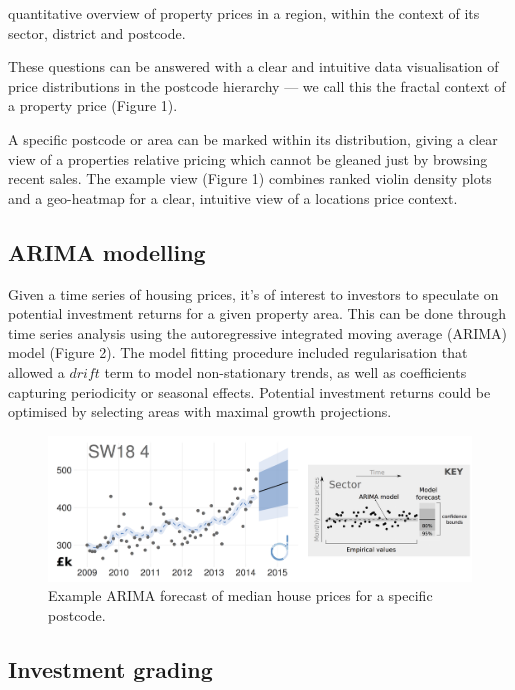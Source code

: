 \documentclass[
10pt, %
a4paper, %
oneside, %
headinclude,footinclude, %
BCOR5mm, %
]{scrartcl}
\begin{document}
\noindent quantitative overview of property
prices in a region, within the context of its sector, district and
postcode.

These questions can be answered with a clear and intuitive data
visualisation of price distributions in the postcode hierarchy --- we
call this the fractal context of a property price (Figure 1).

A specific postcode or area can be marked within its distribution,
giving a clear view of a properties relative pricing which cannot be
gleaned just by browsing recent sales. The example view (Figure 1)
combines ranked violin density plots and a geo-heatmap for a clear,
intuitive view of a locations price context.

\subsection*{ARIMA modelling}

Given a time series of housing prices, it's of interest to investors
to speculate on potential investment returns for a given property
area. This can be done through time series analysis using the
autoregressive integrated moving average (ARIMA) model (Figure 2). The
model fitting procedure included regularisation that allowed a $drift$
term to model non-stationary trends, as well as coefficients capturing
periodicity or seasonal effects. Potential investment returns could be
optimised by selecting areas with
maximal growth projections. \\

\begin{figure}[h]
\begin{center}
\includegraphics[width=.9\textwidth]{Figures/arima.png}
\caption{Example ARIMA forecast of median house prices for a specific postcode.}
\end{center}
\end{figure}

\vspace{-1em}
\subsection*{Investment grading}
\end{document}
